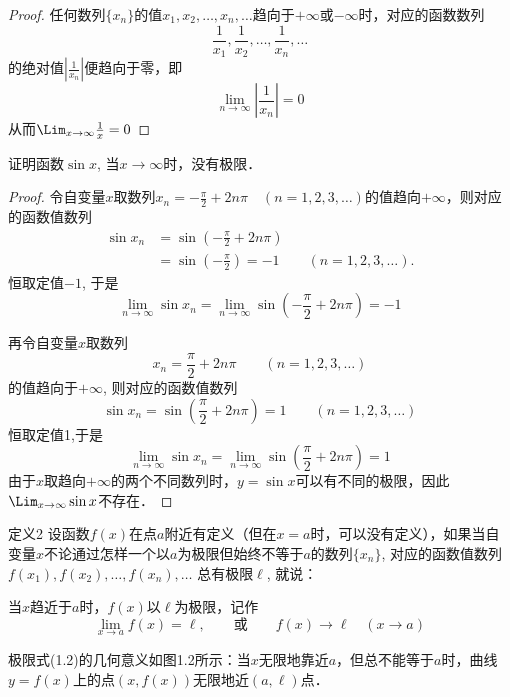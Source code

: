 \begin{proof}
任何数列$\{x_n\}$的值$x_1,x_2,\ldots,x_n,\ldots$趋向于$+\infty$或$-\infty$时，对应的函数数列
\[\frac{1}{x_1},\frac{1}{x_2},\ldots, \frac{1}{x_n},\ldots\]
的绝对值$\left|\frac{1}{x_n}\right|$便趋向于零，即
    \[\lim_{n\to\infty}\left|\frac{1}{x_n}\right|=0\]
    从而$\Lim_{x\to\infty}\frac{1}{x}=0$
\end{proof}

\begin{example}
证明函数$\sin x$, 当$x\to\infty$时，没有极限．
\end{example}

\begin{proof}
令自变量$x$取数列$x_n=-\frac{\pi}{2}+2n\pi\quad (n=1,2,3,\ldots)$的值趋向$+\infty$，则对应的函数值数列
\[\begin{split}
    \sin x_n&=\sin\left(-\frac{\pi}{2}+2n\pi\right)\\
&=\sin\left(-\frac{\pi}{2}\right) =-1 \qquad (n=1, 2, 3, \ldots) .
\end{split}\]
恒取定值$-1$, 于是
\[\lim_{n\to\infty} \sin x_n=\lim_{n\to\infty} \sin \left(-\frac{\pi}{2}+2n\pi\right)=-1\]

再令自变量$x$取数列
\[x_n=\frac{\pi}{2}+2n\pi\qquad  (n=1, 2, 3, \ldots )\]
的值趋向于$+\infty$, 则对应的函数值数列
\[\sin x_n =\sin\left(\frac{\pi}{2}+2n\pi\right) =1\qquad  (n=1, 2, 3, \ldots)\]
恒取定值1,于是
\[\lim_{n\to\infty} \sin x_n=\lim_{n\to\infty} \sin\left(\frac{\pi}{2}+2n\pi\right) =1\]
由于$x$取趋向$+\infty$的两个不同数列时，$y=\sin x$可以有不同的极限，因此
$\Lim_{x\to\infty} \sin x$不存在．
\end{proof}

\begin{blk}{定义2}
 设函数$f(x)$在点$a$附近有定义（但在$x=a$时，可以没有定义），如果当自变量$x$不论通过怎样一个以$a$为极限但始终不等于$a$的数列$\{x_n\}$, 对应的函数值数列$f (x_1) ,f (x_2) , \ldots,f(x_n ) ,\ldots$
总有极限$\ell$, 就说：

当$x$趋近于$a$时，$f(x)$以$\ell$为极限，记作
\begin{equation}
   \lim_{x\to a}f(x)=\ell,\qquad \text{或}\qquad f(x)\to \ell\quad (x\to a) 
\end{equation}
\end{blk}

极限式(1.2)的几何意义如图1.2所示：当$x$无限地靠近$a$，但总不能等于$a$时，曲线$y=f(x)$上的点$(x,f(x))$无限地近$(a,\ell)$点．

\begin{figure}[htp]
    \centering
{}
    \caption{}
\end{figure}


